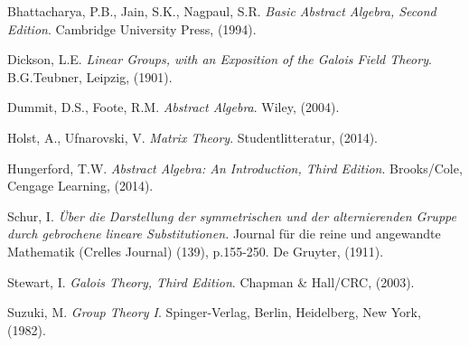 \documentclass[a4paper , 11pt]{book}
\theoremstyle{definition}
\theoremstyle{remark}
\begin{document}
\begin{thebibliography}{9}



Bhattacharya, P.B., Jain, S.K., Nagpaul, S.R. 
\textit{Basic Abstract Algebra, Second Edition}. 
Cambridge University Press,
(1994).

Dickson, L.E. 
\textit{Linear Groups, with an Exposition of the Galois Field Theory}. 
B.G.Teubner, Leipzig,
(1901).

Dummit, D.S., Foote, R.M. 
\textit{Abstract Algebra}. 
Wiley,
(2004).

Holst, A., Ufnarovski, V. 
\textit{Matrix Theory}. 
Studentlitteratur,
(2014).

Hungerford, T.W. 
\textit{Abstract Algebra: An Introduction, Third Edition}. 
Brooks/Cole, Cengage Learning,
(2014).

Schur, I. 
\textit{Über die Darstellung der symmetrischen und der alternierenden Gruppe durch gebrochene lineare Substitutionen.} Journal für die reine und angewandte Mathematik (Crelles Journal) (139), p.155-250. 
De Gruyter,
(1911).

Stewart, I. 
\textit{Galois Theory, Third Edition}. 
Chapman \& Hall/CRC,
(2003).

Suzuki, M. 
\textit{Group Theory I}. 
Spinger-Verlag, Berlin, Heidelberg, New York, 
(1982).

\end{thebibliography}
\end{document}

